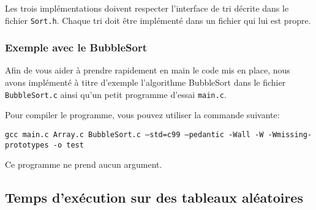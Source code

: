 \documentclass[a4paper,10pt]{article}
\begin{document}
Les trois implémentations doivent respecter l'interface de tri décrite dans le
fichier \texttt{Sort.h}. Chaque tri doit être implémenté dans un fichier qui lui
est propre.

\subsubsection*{Exemple avec le BubbleSort}

Afin de vous aider à prendre rapidement en main le code mis en place, nous avons
implémenté à titre d'exemple l'algorithme BubbleSort dans le fichier
\texttt{BubbleSort.c} ainsi qu'un petit programme d'essai \texttt{main.c}.

Pour compiler le programme, vous pouvez utiliser la commande suivante:

{\small \texttt{gcc main.c Array.c BubbleSort.c --std=c99 --pedantic -Wall -W -Wmissing-prototypes -o test}}

Ce programme ne prend aucun argument.



\subsection{Temps d'exécution sur des tableaux aléatoires}
\end{document}
